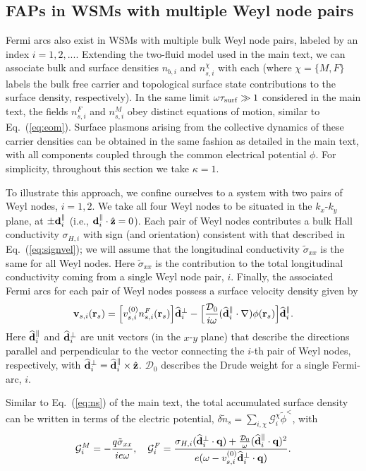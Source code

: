 \documentclass[aps,twocolumn,prl,groupedaddress]{revtex4}
\newcommand{\be}{\begin{equation}}
\newcommand{\ee}{\end{equation}}
\renewcommand{\vec}[1]{{\bf #1}}
\begin{document}
\subsection{FAPs in WSMs with multiple Weyl node pairs}
Fermi arcs also exist in WSMs with multiple bulk Weyl node pairs, labeled by an index $i =1, 2, ... $. 
Extending the two-fluid model used in the main text, we can associate bulk and surface densities $n_{b,i}$ and  $n_{s,i}^\chi$ with each (where $\chi = \{M, F\}$ labels the bulk free carrier and topological surface state contributions to the surface density, respectively). In the same limit $\omega\tau_{\rm surf} \gg 1$ considered in the main text, the fields $n_{s,i}^F$ and $n_{s,i}^M$ obey distinct equations of motion, similar to Eq.~(\ref{eq:eom}). Surface plasmons arising from the collective dynamics of these carrier densities can be obtained in the same fashion as detailed in the main text, with all components coupled through the common electrical potential $\phi$. For simplicity, throughout this section we take $\kappa = 1$.

To illustrate this approach, we confine ourselves to a system with two pairs of Weyl nodes, $i = 1,2$.
We take all four Weyl nodes to be situated in the $k_x$-$k_y$ plane, at $\pm \vec d_i^\parallel$ (i.e., $\vec d_i^\parallel \cdot \hat{\vec{z}} = 0$). 
Each pair of Weyl nodes contributes a bulk Hall conductivity $\sigma_{H,i}$ with sign (and orientation) consistent with that described in Eq.~(\ref{eq:signvel});
we will assume that the longitudinal conductivity $\tilde{\sigma}_{xx}$ is the same for all Weyl nodes. 
Here $\tilde{\sigma}_{xx}$ is the contribution to the total longitudinal conductivity coming from a single Weyl node pair, $i$.
Finally, the associated Fermi arcs for each pair of  Weyl nodes possess a surface velocity density given by
\be
\vec v_{s,i} (\vec{r}_s)= \Big[v_{s,i}^{(0)} n_{s,i}^F (\vec{r}_s)\Big]  \widehat{\vec{d}}_i^\perp  - \Big[ \frac{\mathcal{D}_0}{i \omega} (\widehat{\vec{d}}_i^\parallel \cdot \nabla)  \phi(\vec{r}_s)\Big]\widehat{\vec{d}}_i^\parallel.
\ee
Here $\widehat{\vec{d}}_i^\parallel$ and $\widehat{\vec{d}}_i^\perp$ are unit vectors (in the $x$-$y$ plane) that describe the directions parallel and perpendicular to the vector connecting the $i$-th pair of Weyl nodes, respectively, with $\widehat{\vec{d}}_i^\perp = \widehat{\vec{d}}_i^\parallel \times \hat{\vec{z}}$. 
$\mathcal{D}_0$ describes the Drude weight for a single Fermi-arc, $i$.

Similar to Eq.~(\ref{eq:ns}) of the main text, the total accumulated surface density can be written in terms of the electric potential, $\delta \tilde{n}_s = \sum_{i,\chi} \mathcal{G}^{\chi}_i \tilde{\phi}^<$, with
\be
\mathcal{G}^M_i=  - \frac{q\tilde{\sigma}_{xx} }{ie \omega}, \quad  \mathcal{G}^F_i =  \frac{\sigma_{H,i} (\widehat{\vec{d}}_i^\perp \cdot \vec{q}) +\tfrac{\mathcal{D}_0}{\omega} (\widehat{\vec{d}}_i^\parallel \cdot \vec{q})^2 }{e(\omega  - v_{s,i}^{(0)} \widehat{\vec{d}}_i^\perp  \cdot \vec q)}. 
\label{eq:ns2}
\ee  
\end{document}
